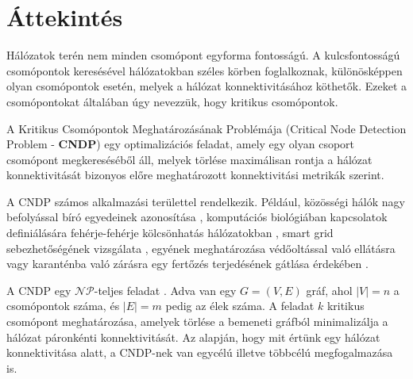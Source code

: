 \section{Áttekintés}\label{sec:ATTEKINTES}

Hálózatok terén nem minden csomópont egyforma fontosságú.
A kulcsfontosságú csomópontok keresésével hálózatokban széles körben foglalkoznak,
különösképpen olyan csomópontok esetén, melyek a hálózat konnektivitásához köthetők.
Ezeket a csomópontokat általában úgy nevezzük, hogy kritikus csomópontok.

A Kritikus Csomópontok Meghatározásának Problémája (Critical Node Detection Problem - \textbf{CNDP})
egy optimalizációs feladat, amely egy olyan csoport csomópont
megkereséséből áll, melyek törlése maximálisan rontja a hálózat
konnektivitását bizonyos előre meghatározott konnektivitási metrikák szerint.

A CNDP számos alkalmazási területtel rendelkezik.
Például, közösségi hálók nagy befolyással bíró egyedeinek azonosítása \cite{kempe2005influential},
komputációs biológiában kapcsolatok definiálására fehérje-fehérje kölcsönhatás hálózatokban \cite{boginski2009identifying, tomaino2012studying},
smart grid sebezhetőségének vizsgálata \cite{nguyen2013detecting},
egyének meghatározása védőoltással való ellátásra vagy karanténba való zárásra egy fertőzés terjedésének gátlása érdekében \cite{ventresca2013evaluation, ventresca2014randomized, aspnes2006inoculation}.

A CNDP egy $\mathcal{N}\mathcal{P}$-teljes feladat \cite{arulselvan2009detecting}. Adva van egy $G = (V, E)$ gráf, ahol $|V| = n$ a csomópontok száma,
és $|E| = m$ pedig az élek száma. A feladat $k$ kritikus csomópont meghatározása, amelyek törlése a bemeneti
gráfból minimalizálja a hálózat páronkénti konnektivitását. Az alapján, hogy mit értünk egy hálózat
konnektivitása alatt, a CNDP-nek van egycélú illetve többcélú megfogalmazása is.
